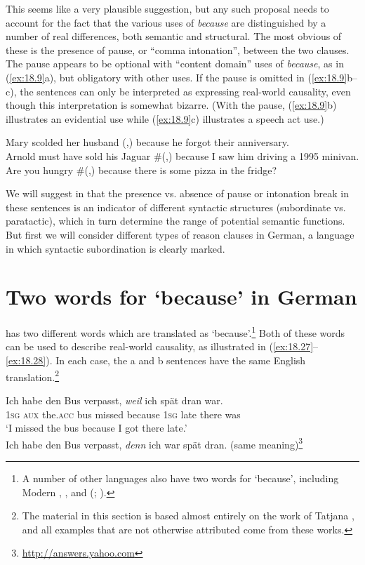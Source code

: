 This seems like a very plausible suggestion, but any such proposal needs to account for the fact that the various uses of \textit{because} are distinguished by a number of real differences, both semantic and structural. The most obvious of these is the presence of pause, or “comma intonation”, between the two clauses. The pause appears to be optional with “content domain” uses of \textit{because}, as in (\ref{ex:18.9}a), but obligatory with other uses. If the pause is omitted in (\ref{ex:18.9}b--c), the sentences can only be interpreted as expressing real-world causality, even though this interpretation is somewhat bizarre. (With the pause, (\ref{ex:18.9}b) illustrates an evidential use while (\ref{ex:18.9}c) illustrates a speech act use.)


\ea \label{ex:18.9}
\ea  Mary scolded her husband (,) because he forgot their anniversary.\\
\ex Arnold must have sold his Jaguar \#(,) because I saw him driving a 1995 minivan.\\
\ex Are you hungry \#(,) because there is some pizza in the fridge?
                       \z
\z


We will suggest in  that the presence vs. absence of pause or intonation break in these sentences is an indicator of different syntactic structures (subordinate vs. paratactic), which in turn determine the range of potential semantic functions. But first we will consider different types of reason clauses in German, a language in which syntactic subordination is clearly marked.


\section{Two words for ‘because’ in German}\label{sec:18.5}


 has two different words which are translated as ‘because’.\footnote{A number of other languages also have two words for ‘because’, including Modern , , and  (\citealt{Pit2003}; \citealt{Kitis2006}).} Both of these words can be used to describe real-world causality, as illustrated in (\ref{ex:18.27}--\ref{ex:18.28}). In each case, the a and b sentences have the same English translation.\footnote{The material in this section is based almost entirely on the work of Tatjana \citet{Scheffler2005,Scheffler2008}, and all examples that are not otherwise attributed come from these works.} 


\ea \label{ex:18.27}
\ea  \gll Ich  habe  den  Bus  verpasst,  \textit{weil}  ich  spät  dran  war.\\
\textsc{1sg}  \textsc{aux}  the.\textsc{acc}  bus  missed  because  \textsc{1sg}  late  there  was\\
\glt ‘I missed the bus because I got there late.’ \\
\ex  Ich habe den Bus verpasst, \textit{denn} ich war spät dran. (same meaning)\footnote{\url{http://answers.yahoo.com}}
\z \z

